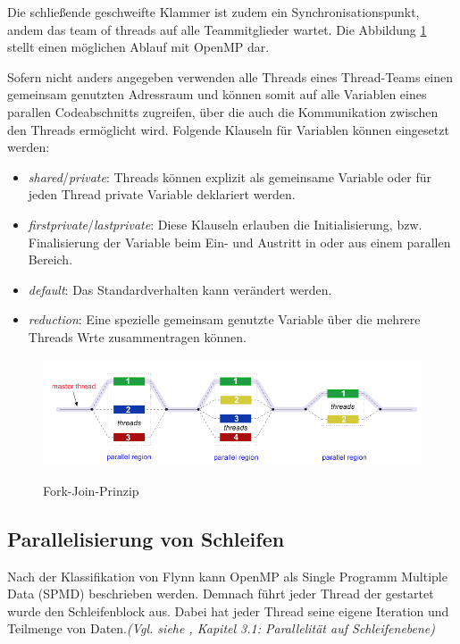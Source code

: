 \documentclass[11pt]{scrartcl}
\begin{document}
Die schließende geschweifte Klammer ist zudem ein Synchronisationspunkt, andem das team of threads auf alle Teammitglieder wartet. Die Abbildung \ref{join_fork_model} stellt einen möglichen Ablauf mit OpenMP dar.

Sofern nicht anders angegeben verwenden alle Threads eines Thread-Teams einen gemeinsam genutzten Adressraum und können somit auf alle Variablen eines parallen Codeabschnitts zugreifen, über die auch die Kommunikation zwischen den Threads ermöglicht wird. Folgende Klauseln für Variablen können eingesetzt werden:

\begin{itemize}
\item \textit{shared}/\textit{private}: Threads können explizit als gemeinsame Variable oder für jeden Thread private Variable deklariert werden.
\item \textit{firstprivate}/\textit{lastprivate}: Diese Klauseln erlauben die Initialisierung, bzw. Finalisierung der Variable beim Ein- und Austritt in oder aus einem parallen Bereich.
\item \textit{default}: Das Standardverhalten kann verändert werden. %
\item \textit{reduction}: Eine spezielle gemeinsam genutzte Variable über die mehrere Threads Wrte zusammentragen können.
\end{itemize}


\begin{figure}[h!]
\centering
\includegraphics[width=1.0\textwidth]{img/fork_join.png}
\label{join_fork_model}
\caption{Fork-Join-Prinzip}
\end{figure} 

\subsection{Parallelisierung von Schleifen} 
Nach der Klassifikation von Flynn kann OpenMP als Single Programm Multiple Data (SPMD) beschrieben werden. Demnach führt jeder Thread der gestartet wurde den Schleifenblock aus. Dabei hat jeder Thread seine eigene Iteration und Teilmenge von Daten.\textit{(Vgl. siehe \cite{omp08}, Kapitel 3.1: Parallelität auf Schleifenebene)}
\end{document}

